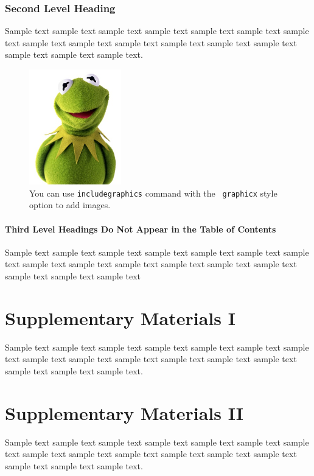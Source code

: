 \documentclass[11pt]{uonthesis}
\begin{document}
\subsection{Second Level Heading}

Sample text sample text sample text sample text sample text sample
text sample text sample text sample text sample text sample text
sample text sample text sample text sample text sample text.

\begin{figure}
\centering
\includegraphics[width=40mm]{kermit.jpg}
\caption{You can use {\tt includegraphics} command with the {\tt
    graphicx} style option to add images.}
\end{figure}


\subsubsection{Third Level Headings Do Not Appear in the Table of Contents}

Sample text sample text sample text sample text sample text sample
text sample text sample text sample text sample text sample text
sample text sample text sample text sample text sample text~\cite{Lam94}


\begin{appendices}

\chapter{Supplementary Materials I}

Sample text sample text sample text sample text sample text sample
text sample text sample text sample text sample text sample text
sample text sample text sample text sample text sample text.

\chapter{Supplementary Materials II}

Sample text sample text sample text sample text sample text sample
text sample text sample text sample text sample text sample text
sample text sample text sample text sample text sample text.

\end{appendices}
\end{document}
